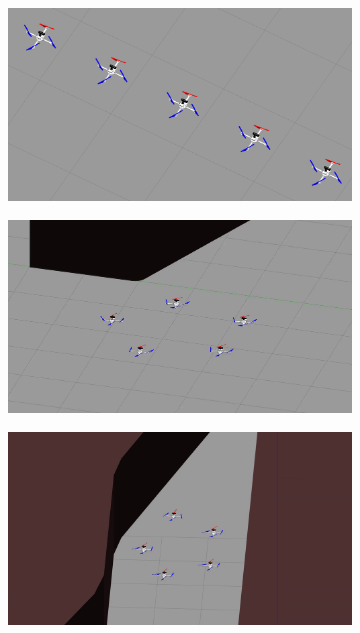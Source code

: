 \begin{figure}[h!]
    \centering
    \begin{subfigure}[b]{0.325\textwidth}
    \includegraphics[width=\textwidth]{paper3/images/gazebo_01.png}
    \caption{}
    \end{subfigure}
    \begin{subfigure}[b]{0.325\textwidth}
    \includegraphics[width=\textwidth]{paper3/images/gazebo_02.png}
    \caption{}
    \end{subfigure}
    \begin{subfigure}[b]{0.325\textwidth}
    \includegraphics[width=\textwidth]{paper3/images/gazebo_03.png}

\end{subfigure}
\end{figure}
